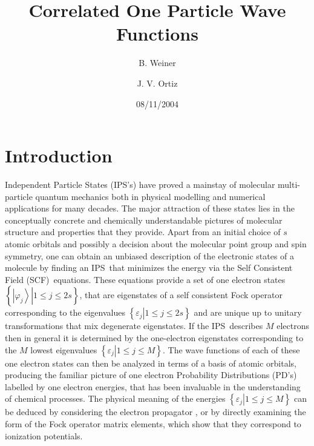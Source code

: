 \documentclass[aps,preprint]{revtex4}%
\begin{document}
\preprint{ }
\title{Correlated One Particle Wave Functions}
\author{B. Weiner}
\author{J. V. Ortiz}
\pacs{}

\begin{abstract}


\end{abstract}
\date{08/11/2004}
\maketitle
\tableofcontents


\section{Introduction \label{intro}}

Independent Particle States (IPS's) have proved a mainstay of molecular
multi-particle quantum mechanics both in physical modelling and numerical
applications for many decades. The major attraction of these states lies in
the conceptually concrete and chemically understandable pictures of molecular
structure and properties that they provide. Apart from an initial choice of
$s$ atomic orbitals and possibly a decision about the molecular point group
and spin symmetry, one can obtain an unbiased description of the electronic
states of a molecule by finding an IPS\ that minimizes the energy via the Self
Consistent Field (SCF)\ equations. These equations provide a set of one
electron states $\left\{  \left.  \left\vert \varphi_{j}\right\rangle
\right\vert 1\leq j\leq2s\right\}  $, that are eigenstates of a self
consistent Fock operator corresponding to the eigenvalues $\left\{  \left.
\varepsilon_{j}\right\vert 1\leq j\leq2s\right\}  $ and are unique up to
unitary transformations that mix degenerate eigenstates. If the IPS\ describes
$M$ electrons then in general it is determined by the one-electron eigenstates
corresponding to the $M$ lowest eigenvalues $\left\{  \left.  \varepsilon
_{j}\right\vert 1\leq j\leq M\right\}  $. The wave functions of each of these
one electron states can then be analyzed in terms of a basis of atomic
orbitals, producing the familiar picture of one electron Probability
Distributions (PD's) labelled by one electron energies, that has been
invaluable in the understanding of chemical processes. The physical meaning of
the energies $\left\{  \left.  \varepsilon_{j}\right\vert 1\leq j\leq
M\right\}  $ can be deduced by considering the electron propagator
\cite{ortiz}, or by directly examining the form of the Fock operator matrix
elements, which show that they correspond to ionization potentials.
\end{document}
